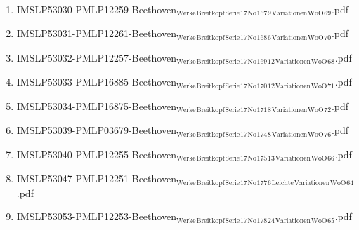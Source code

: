\documentclass[11pt]{article}
\begin{document}
\begin{enumerate}
\begin{enumerate}
\begin{enumerate}
\item IMSLP53030-PMLP12259-Beethoven$_{\text{Werke}}$$_{\text{Breitkopf}}$$_{\text{Serie}}$$_{\text{17}}$$_{\text{No}}$$_{\text{167}}$$_{\text{9}}$$_{\text{Variationen}}$$_{\text{WoO}}$$_{\text{69}}$.pdf
\label{sec-1-1-1-1-44-9-6-9-13}

\item IMSLP53031-PMLP12261-Beethoven$_{\text{Werke}}$$_{\text{Breitkopf}}$$_{\text{Serie}}$$_{\text{17}}$$_{\text{No}}$$_{\text{168}}$$_{\text{6}}$$_{\text{Variationen}}$$_{\text{WoO}}$$_{\text{70}}$.pdf
\label{sec-1-1-1-1-44-9-6-9-14}

\item IMSLP53032-PMLP12257-Beethoven$_{\text{Werke}}$$_{\text{Breitkopf}}$$_{\text{Serie}}$$_{\text{17}}$$_{\text{No}}$$_{\text{169}}$$_{\text{12}}$$_{\text{Variationen}}$$_{\text{WoO}}$$_{\text{68}}$.pdf
\label{sec-1-1-1-1-44-9-6-9-15}

\item IMSLP53033-PMLP16885-Beethoven$_{\text{Werke}}$$_{\text{Breitkopf}}$$_{\text{Serie}}$$_{\text{17}}$$_{\text{No}}$$_{\text{170}}$$_{\text{12}}$$_{\text{Variationen}}$$_{\text{WoO}}$$_{\text{71}}$.pdf
\label{sec-1-1-1-1-44-9-6-9-16}

\item IMSLP53034-PMLP16875-Beethoven$_{\text{Werke}}$$_{\text{Breitkopf}}$$_{\text{Serie}}$$_{\text{17}}$$_{\text{No}}$$_{\text{171}}$$_{\text{8}}$$_{\text{Variationen}}$$_{\text{WoO}}$$_{\text{72}}$.pdf
\label{sec-1-1-1-1-44-9-6-9-17}

\item IMSLP53039-PMLP03679-Beethoven$_{\text{Werke}}$$_{\text{Breitkopf}}$$_{\text{Serie}}$$_{\text{17}}$$_{\text{No}}$$_{\text{174}}$$_{\text{8}}$$_{\text{Variationen}}$$_{\text{WoO}}$$_{\text{76}}$.pdf
\label{sec-1-1-1-1-44-9-6-9-18}

\item IMSLP53040-PMLP12255-Beethoven$_{\text{Werke}}$$_{\text{Breitkopf}}$$_{\text{Serie}}$$_{\text{17}}$$_{\text{No}}$$_{\text{175}}$$_{\text{13}}$$_{\text{Variationen}}$$_{\text{WoO}}$$_{\text{66}}$.pdf
\label{sec-1-1-1-1-44-9-6-9-19}

\item IMSLP53047-PMLP12251-Beethoven$_{\text{Werke}}$$_{\text{Breitkopf}}$$_{\text{Serie}}$$_{\text{17}}$$_{\text{No}}$$_{\text{177}}$$_{\text{6}}$$_{\text{Leichte}}$$_{\text{Variationen}}$$_{\text{WoO}}$$_{\text{64}}$.pdf
\label{sec-1-1-1-1-44-9-6-9-20}

\item IMSLP53053-PMLP12253-Beethoven$_{\text{Werke}}$$_{\text{Breitkopf}}$$_{\text{Serie}}$$_{\text{17}}$$_{\text{No}}$$_{\text{178}}$$_{\text{24}}$$_{\text{Variationen}}$$_{\text{WoO}}$$_{\text{65}}$.pdf
\label{sec-1-1-1-1-44-9-6-9-21}


\end{enumerate}
\end{enumerate}
\end{enumerate}
\end{document}
